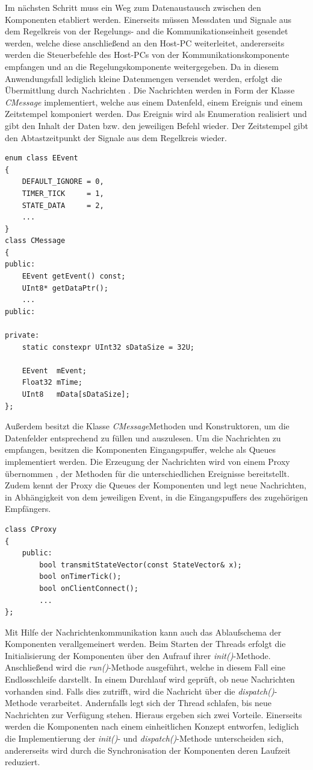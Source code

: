 Im nächsten Schritt muss ein Weg zum Datenaustausch zwischen den Komponenten etabliert werden. Einerseits müssen Messdaten und Signale aus dem Regelkreis von der Regelungs- and die Kommunikationseinheit gesendet werden, welche diese anschließend an den Host-PC weiterleitet, andererseits werden die Steuerbefehle des Host-PCs von der Kommunikationskomponente empfangen und an die Regelungskomponente weitergegeben. Da in diesem Anwendungsfall lediglich kleine Datenmengen versendet werden, erfolgt die Übermittlung durch Nachrichten \cite[S. 196]{Wietzke1}. Die Nachrichten werden in Form der Klasse \textit{CMessage} implementiert, welche aus einem Datenfeld, einem Ereignis und einem Zeitstempel komponiert werden. Das Ereignis wird als Enumeration realisiert und gibt den Inhalt der Daten bzw. den jeweiligen Befehl wieder. Der Zeitstempel gibt den Abtastzeitpunkt der Signale aus dem Regelkreis wieder. 
\begin{lstlisting}[caption={Beispielhafte Implementierung der Events und Nachrichten},captionpos=b]
enum class EEvent
{
	DEFAULT_IGNORE = 0,
	TIMER_TICK     = 1,
	STATE_DATA     = 2,
	...
}
class CMessage
{
public:
	EEvent getEvent() const;
	UInt8* getDataPtr();
	...
public:

private:
	static constexpr UInt32 sDataSize = 32U;

	EEvent  mEvent;
	Float32 mTime;	
	UInt8   mData[sDataSize];
};
\end{lstlisting}
Außerdem besitzt die Klasse \textit{CMessage}Methoden und Konstruktoren, um die Datenfelder entsprechend zu füllen und auszulesen. Um die Nachrichten zu empfangen, besitzen die Komponenten Eingangspuffer, welche als Queues implementiert werden. Die Erzeugung der Nachrichten wird von einem Proxy übernommen \cite[S. 285 ff.]{Wietzke1}, der Methoden für die unterschiedlichen Ereignisse bereitstellt. Zudem kennt der Proxy die Queues der Komponenten und legt neue Nachrichten, in Abhängigkeit von dem jeweiligen Event, in die Eingangspuffers des zugehörigen Empfängers.
\begin{lstlisting}[caption={Aufbau der Proxy-Klasse},captionpos=b]
class CProxy
{
	public:
		bool transmitStateVector(const StateVector& x);
		bool onTimerTick();
		bool onClientConnect();
		...
};
\end{lstlisting}
Mit Hilfe der Nachrichtenkommunikation kann auch das Ablaufschema der Komponenten verallgemeinert werden. Beim Starten der Threads erfolgt die Initialisierung der Komponenten über den Aufrauf ihrer \textit{init()}-Methode. Anschließend wird die \textit{run()}-Methode ausgeführt, welche in diesem Fall eine Endlosschleife darstellt. In einem Durchlauf wird geprüft, ob neue Nachrichten vorhanden sind. Falls dies zutrifft, wird die Nachricht über die \textit{dispatch()}-Methode verarbeitet. Andernfalls legt sich der Thread schlafen, bis neue Nachrichten zur Verfügung stehen. Hieraus ergeben sich zwei Vorteile. Einerseits werden die Komponenten nach einem einheitlichen Konzept entworfen, lediglich die Implementierung der \textit{init()}- und \textit{dispatch()}-Methode unterscheiden sich, andererseits wird durch die Synchronisation der Komponenten deren Laufzeit reduziert.